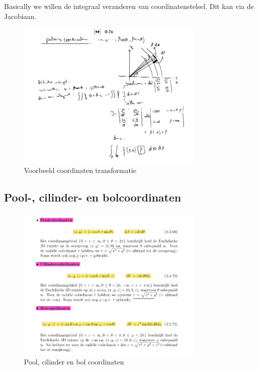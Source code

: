 \documentclass[a4paper]{report}
\begin{document}
Basically we willen de integraal veranderen van coordinatenstelsel. Dit kan via de Jacobiaan.


\begin{figure}[H]
	\centering
	\includegraphics[width=0.8\textwidth]{assets/voorbeeld_coordinaten_transfo_integralen.png}
	\caption{Voorbeeld coordinaten transformatie}
	\label{fig:voorbeeld_coordinaten_transfo_integralen}
\end{figure}


\subsection{Pool-, cilinder- en bolcoordinaten}


\begin{figure}[H]
	\centering
	\includegraphics[width=0.8\textwidth]{assets/pool_cilinder_bol_coordinaten.png}
	\caption{Pool, cilinder en bol coordinaten}
	\label{fig:pool_cilinder_bol_coordinaten}
\end{figure}
\end{document}
